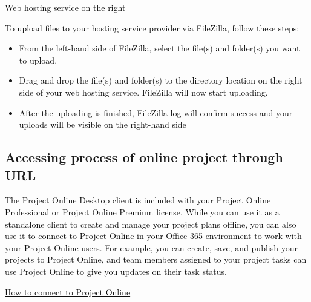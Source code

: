 \documentclass[12pt]{report}
\renewcommand{\_}{\kern-1.5pt\textunderscore\kern-1.5pt}
\begin{document}
	\item \textcolor[HTML]{0D0D0D}{Web hosting service on the right}\par

\textcolor[HTML]{0D0D0D}{To upload files to your hosting service provider via FileZilla, follow these steps:}\par

\begin{itemize}
	\item \textcolor[HTML]{0D0D0D}{From the left-hand side of FileZilla, select the file(s) and folder(s) you want to upload.}\par


\vspace{\baselineskip}	\item \textcolor[HTML]{0D0D0D}{Drag and drop the file(s) and folder(s) to the directory location on the right side of your web hosting service. FileZilla will now start uploading.}\par

	\item \textcolor[HTML]{0D0D0D}{After the uploading is finished, FileZilla log will confirm success and your uploads will be visible on the right-hand side}
\end{itemize}\par


\vspace{\baselineskip}\subsection{Accessing process of online project through URL}

\vspace{\baselineskip}\begin{adjustwidth}{1.18in}{0.62in}
\textcolor[HTML]{0D0D0D}{The Project Online Desktop client is included with your Project Online Professional or Project Online Premium license. While you can use it as a standalone client to create and manage your project plans oﬄine, you can also use it to connect to Project Online in your Oﬃce 365 environment to work with your Project Online users. For example, you can create, save, and publish your projects to Project Online, and team members assigned to your project tasks can use Project Online to give you updates on their task status.}\par

\end{adjustwidth}


\vspace{\baselineskip}\begin{adjustwidth}{1.18in}{0.0in}
\textcolor[HTML]{0D0D0D}{\uline{How to connect to Project Online}}\par

\end{adjustwidth}
\end{document}
